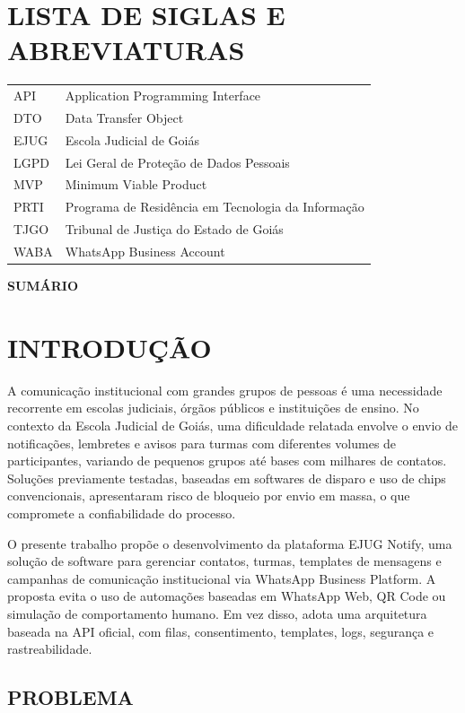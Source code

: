 \documentclass[12pt,letterpaper,oneside]{report}
\makeatletter
\renewcommand{\tableofcontents}{%
  \clearpage
  \thispagestyle{plain}%
  \begin{center}{\bfseries\fontsize{14}{16}\selectfont SUMÁRIO}\end{center}
  \vspace{1.2cm}
  \@starttoc{toc}%
}
\makeatother
\begin{document}
\chapter*{LISTA DE SIGLAS E ABREVIATURAS}
\begin{tabular}{@{}ll@{}}
API & Application Programming Interface\\
DTO & Data Transfer Object\\
EJUG & Escola Judicial de Goiás\\
LGPD & Lei Geral de Proteção de Dados Pessoais\\
MVP & Minimum Viable Product\\
PRTI & Programa de Residência em Tecnologia da Informação\\
TJGO & Tribunal de Justiça do Estado de Goiás\\
WABA & WhatsApp Business Account\\
\end{tabular}

\clearpage
\tableofcontents
\clearpage

\chapter{INTRODUÇÃO}

A comunicação institucional com grandes grupos de pessoas é uma necessidade recorrente em escolas judiciais, órgãos públicos e instituições de ensino. No contexto da Escola Judicial de Goiás, uma dificuldade relatada envolve o envio de notificações, lembretes e avisos para turmas com diferentes volumes de participantes, variando de pequenos grupos até bases com milhares de contatos. Soluções previamente testadas, baseadas em softwares de disparo e uso de chips convencionais, apresentaram risco de bloqueio por envio em massa, o que compromete a confiabilidade do processo.

O presente trabalho propõe o desenvolvimento da plataforma EJUG Notify, uma solução de software para gerenciar contatos, turmas, templates de mensagens e campanhas de comunicação institucional via WhatsApp Business Platform. A proposta evita o uso de automações baseadas em WhatsApp Web, QR Code ou simulação de comportamento humano. Em vez disso, adota uma arquitetura baseada na API oficial, com filas, consentimento, templates, logs, segurança e rastreabilidade.

\section{PROBLEMA}
\end{document}
